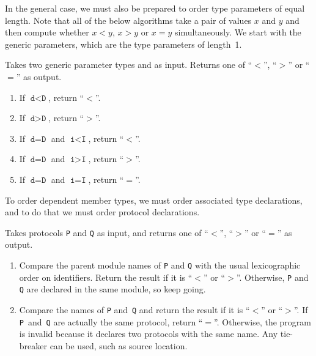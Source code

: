 \documentclass[../generics]{subfiles}
\begin{document}
In the general case, we must also be prepared to order type parameters of equal length. Note that all of the below algorithms take a pair of values $x$ and $y$ and then compute whether $x<y$, $x>y$ or $x=y$ simultaneously. We start with the generic parameters, which are the type parameters of length~1.

\begin{algorithm}\label{generic parameter order} Takes two generic parameter types  and  as input. Returns one of ``$<$'', ``$>$'' or ``$=$'' as output.
\begin{enumerate}
\item If $\texttt{d}<\texttt{D}$, return ``$<$''.
\item If $\texttt{d}>\texttt{D}$, return ``$>$''.
\item If $\texttt{d}=\texttt{D}$ and $\texttt{i}<\texttt{I}$, return ``$<$''.
\item If $\texttt{d}=\texttt{D}$ and $\texttt{i}>\texttt{I}$, return ``$>$''.
\item If $\texttt{d}=\texttt{D}$ and $\texttt{i}=\texttt{I}$, return ``$=$''.
\end{enumerate}
\end{algorithm}

To order dependent member types, we must order associated type declarations, and to do that we must order protocol declarations.

\begin{algorithm}\label{linear protocol order} Takes protocols \texttt{P} and \texttt{Q} as input, and returns one of ``$<$'', ``$>$'' or ``$=$'' as output.
\begin{enumerate}
\item Compare the parent module names of \texttt{P} and \texttt{Q} with the usual lexicographic order on identifiers. Return the result if it is ``$<$'' or ``$>$''. Otherwise, \texttt{P} and \texttt{Q} are declared in the same module, so keep going.
\item Compare the names of \texttt{P} and~\texttt{Q} and return the result if it is ``$<$'' or ``$>$''. If \texttt{P}~and~\texttt{Q} are actually the same protocol, return ``$=$''. Otherwise, the program is invalid because it declares two protocols with the same name. Any tie-breaker can be used, such as source location.
\end{enumerate}
\end{algorithm}
\end{document}
